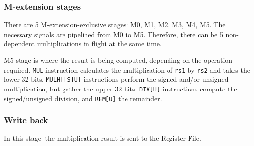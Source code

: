 \subsubsection{M-extension stages}
There are 5 M-extension-exclusive stages: M0, M1, M2, M3, M4, M5.
The necessary signals are pipelined from M0 to M5.
Therefore, there can be 5 non-dependent multiplications in flight at the same time.

M5 stage is where the result is being computed, depending on the operation required.
\texttt{MUL} instruction calculates the multiplication of \texttt{rs1} by \texttt{rs2} and takes the lower 32 bits.
\texttt{MULH[[S]U]} instructions perform the signed and/or unsigned multiplication, but gather the upper 32 bits.
\texttt{DIV[U]} instructions compute the signed/unsigned division, and \texttt{REM[U]} the remainder.

\subsubsection{Write back}
In this stage, the multiplication result is sent to the Register File.
